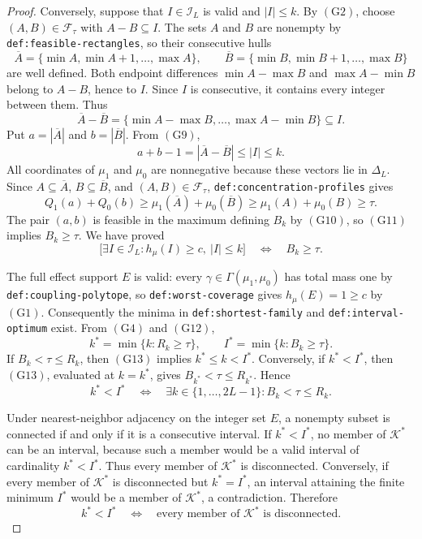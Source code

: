 \documentclass{article}
\begin{document}
\begin{proof}
Conversely, suppose that \(I\in\mathcal I_L\) is valid and \(|I|\leq k\).  By \((\mathrm{G2})\), choose \((A,B)\in\mathcal F_\tau\) with \(A-B\subseteq I\).  The sets \(A\) and \(B\) are nonempty by \texttt{def:feasible-rectangles}, so their consecutive hulls
\[
\overline A=\{\min A,\min A+1,\ldots,\max A\},
\qquad
\overline B=\{\min B,\min B+1,\ldots,\max B\}
\tag{G8}
\]
are well defined.  Both endpoint differences \(\min A-\max B\) and \(\max A-\min B\) belong to \(A-B\), hence to \(I\).  Since \(I\) is consecutive, it contains every integer between them.  Thus
\[
\overline A-\overline B
=\{\min A-\max B,\ldots,\max A-\min B\}
\subseteq I.
\tag{G9}
\]
Put \(a=|\overline A|\) and \(b=|\overline B|\).  From \((\mathrm{G9})\),
\[
a+b-1=|\overline A-\overline B|\leq |I|\leq k.
\tag{G10}
\]
All coordinates of \(\mu_1\) and \(\mu_0\) are nonnegative because these vectors lie in \(\Delta_L\).  Since \(A\subseteq\overline A\), \(B\subseteq\overline B\), and \((A,B)\in\mathcal F_\tau\), \texttt{def:concentration-profiles} gives
\[
Q_1(a)+Q_0(b)
\geq \mu_1(\overline A)+\mu_0(\overline B)
\geq \mu_1(A)+\mu_0(B)
\geq\tau.
\tag{G11}
\]
The pair \((a,b)\) is feasible in the maximum defining \(B_k\) by \((\mathrm{G10})\), so \((\mathrm{G11})\) implies \(B_k\geq\tau\).  We have proved
\[
\bigl[\exists I\in\mathcal I_L:h_\mu(I)\geq c,\ |I|\leq k\bigr]
\quad\Longleftrightarrow\quad B_k\geq\tau.
\tag{G12}
\]

The full effect support \(E\) is valid: every \(\gamma\in\Gamma(\mu_1,\mu_0)\) has total mass one by \texttt{def:coupling-polytope}, so \texttt{def:worst-coverage} gives \(h_\mu(E)=1\geq c\) by \((\mathrm{G1})\).  Consequently the minima in \texttt{def:shortest-family} and \texttt{def:interval-optimum} exist.  From \((\mathrm{G4})\) and \((\mathrm{G12})\),
\[
k^*=\min\{k:R_k\geq\tau\},
\qquad
I^*=\min\{k:B_k\geq\tau\}.
\tag{G13}
\]
If \(B_k<\tau\leq R_k\), then \((\mathrm{G13})\) implies \(k^*\leq k<I^*\).  Conversely, if \(k^*<I^*\), then \((\mathrm{G13})\), evaluated at \(k=k^*\), gives \(B_{k^*}<\tau\leq R_{k^*}\).  Hence
\[
k^*<I^*
\quad\Longleftrightarrow\quad
\exists k\in\{1,\ldots,2L-1\}:B_k<\tau\leq R_k.
\tag{G14}
\]

Under nearest-neighbor adjacency on the integer set \(E\), a nonempty subset is connected if and only if it is a consecutive interval.  If \(k^*<I^*\), no member of \(\mathcal K^*\) can be an interval, because such a member would be a valid interval of cardinality \(k^*<I^*\).  Thus every member of \(\mathcal K^*\) is disconnected.  Conversely, if every member of \(\mathcal K^*\) is disconnected but \(k^*=I^*\), an interval attaining the finite minimum \(I^*\) would be a member of \(\mathcal K^*\), a contradiction.  Therefore
\[
k^*<I^*
\quad\Longleftrightarrow\quad
\text{every member of }\mathcal K^*\text{ is disconnected}.
\tag{G15}
\]


\end{proof}
\end{document}
